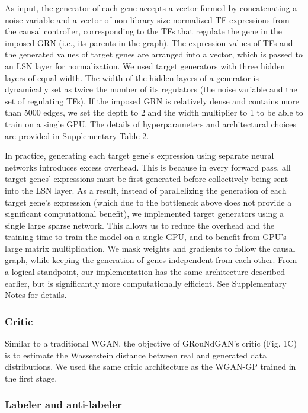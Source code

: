 As input, the generator of each gene accepts a vector formed by concatenating a noise variable and a vector of non-library size normalized TF expressions from the causal controller, corresponding to the TFs that regulate the gene in the imposed GRN (i.e., its parents in the graph). The expression values of TFs and the generated values of target genes are arranged into a vector, which is passed to an LSN layer for normalization. We used target generators with three hidden layers of equal width. The width of the hidden layers of a generator is dynamically set as twice the number of its regulators (the noise variable and the set of regulating TFs). If the imposed GRN is relatively dense and contains more than 5000 edges, we set the depth to 2 and the width multiplier to 1 to be able to train on a single GPU. The details of hyperparameters and architectural choices are provided in Supplementary Table 2.

In practice, generating each target gene’s expression using separate neural networks introduces excess overhead. This is because in every forward pass, all target genes’ expressions must be first generated before collectively being sent into the LSN layer. As a result, instead of parallelizing the generation of each target gene’s expression (which due to the bottleneck above does not provide a significant computational benefit), we implemented target generators using a single large sparse network. This allows us to reduce the overhead and the training time to train the model on a single GPU, and to benefit from GPU’s large matrix multiplication. We mask weights and gradients to follow the causal graph, while keeping the generation of genes independent from each other. From a logical standpoint, our implementation has the same architecture described earlier, but is significantly more computationally efficient. See Supplementary Notes for details.


\subsubsection*{Critic}

Similar to a traditional WGAN, the objective of GRouNdGAN’s critic (Fig. 1C) is to estimate the Wasserstein distance between real and generated data distributions. We used the same critic architecture as the WGAN-GP trained in the first stage.


\subsubsection*{Labeler and anti-labeler}

